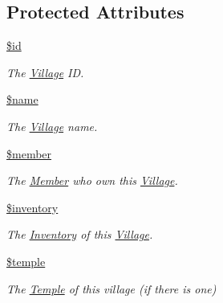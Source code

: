 \subsection*{Protected Attributes}
\begin{DoxyCompactItemize}
\item 
\mbox{\label{classVillage_a2bcf473f69629aaab39a704256949576}} 
\mbox{\hyperlink{classVillage_a2bcf473f69629aaab39a704256949576}{\$id}}
\begin{DoxyCompactList}\small\item\em The \mbox{\hyperlink{classVillage}{Village}} ID. \end{DoxyCompactList}\item 
\mbox{\label{classVillage_a4a4f574f5ae8147fb73d489089204b42}} 
\mbox{\hyperlink{classVillage_a4a4f574f5ae8147fb73d489089204b42}{\$name}}
\begin{DoxyCompactList}\small\item\em The \mbox{\hyperlink{classVillage}{Village}} name. \end{DoxyCompactList}\item 
\mbox{\label{classVillage_ab2f11ad7b3d84e3aa75cbcce8c173658}} 
\mbox{\hyperlink{classVillage_ab2f11ad7b3d84e3aa75cbcce8c173658}{\$member}}
\begin{DoxyCompactList}\small\item\em The \mbox{\hyperlink{classMember}{Member}} who own this \mbox{\hyperlink{classVillage}{Village}}. \end{DoxyCompactList}\item 
\mbox{\label{classVillage_a8a30fc4f0084b38023515d77856da517}} 
\mbox{\hyperlink{classVillage_a8a30fc4f0084b38023515d77856da517}{\$inventory}}
\begin{DoxyCompactList}\small\item\em The \mbox{\hyperlink{classInventory}{Inventory}} of this \mbox{\hyperlink{classVillage}{Village}}. \end{DoxyCompactList}\item 
\mbox{\label{classVillage_afbff90d288a3846443f69081e8ef1831}} 
\mbox{\hyperlink{classVillage_afbff90d288a3846443f69081e8ef1831}{\$temple}}
\begin{DoxyCompactList}\small\item\em The \mbox{\hyperlink{classTemple}{Temple}} of this village (if there is one) \end{DoxyCompactList}\end{DoxyCompactItemize}
